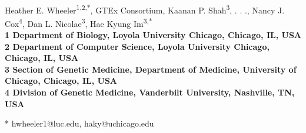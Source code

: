 \documentclass[10pt,letterpaper]{article}
\date{}
\begin{document}
\vspace*{0.35in}

\begin{flushleft}
{\Large
\textbf{}
}
\newline
\\
Heather E. Wheeler\textsuperscript{1,2,*},
GTEx Consortium,
Kaanan P. Shah\textsuperscript{3},
. . ., Nancy J. Cox\textsuperscript{4}, Dan L.
Nicolae\textsuperscript{3}, Hae Kyung Im\textsuperscript{3,*}
\\
\bigskip
\bf{1} Department of Biology, Loyola University Chicago, Chicago, IL, USA
\\
\bf{2} Department of Computer Science, Loyola University Chicago, Chicago, IL, USA
\\
\bf{3} Section of Genetic Medicine, Department of Medicine, University of Chicago, Chicago, IL, USA
\\
\bf{4} Division of Genetic Medicine, Vanderbilt University, Nashville, TN, USA
\bigskip

% 
%





* hwheeler1@luc.edu, haky@uchicago.edu

\end{flushleft}
\end{document}
